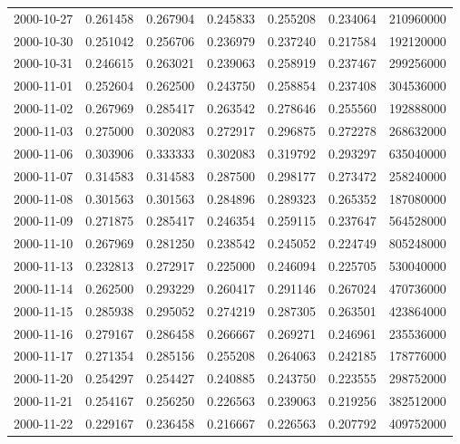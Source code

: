 \begin{tabular}{lrrrrrr}
2000-10-27 &    0.261458 &    0.267904 &    0.245833 &    0.255208 &    0.234064 &   210960000 \\
2000-10-30 &    0.251042 &    0.256706 &    0.236979 &    0.237240 &    0.217584 &   192120000 \\
2000-10-31 &    0.246615 &    0.263021 &    0.239063 &    0.258919 &    0.237467 &   299256000 \\
2000-11-01 &    0.252604 &    0.262500 &    0.243750 &    0.258854 &    0.237408 &   304536000 \\
2000-11-02 &    0.267969 &    0.285417 &    0.263542 &    0.278646 &    0.255560 &   192888000 \\
2000-11-03 &    0.275000 &    0.302083 &    0.272917 &    0.296875 &    0.272278 &   268632000 \\
2000-11-06 &    0.303906 &    0.333333 &    0.302083 &    0.319792 &    0.293297 &   635040000 \\
2000-11-07 &    0.314583 &    0.314583 &    0.287500 &    0.298177 &    0.273472 &   258240000 \\
2000-11-08 &    0.301563 &    0.301563 &    0.284896 &    0.289323 &    0.265352 &   187080000 \\
2000-11-09 &    0.271875 &    0.285417 &    0.246354 &    0.259115 &    0.237647 &   564528000 \\
2000-11-10 &    0.267969 &    0.281250 &    0.238542 &    0.245052 &    0.224749 &   805248000 \\
2000-11-13 &    0.232813 &    0.272917 &    0.225000 &    0.246094 &    0.225705 &   530040000 \\
2000-11-14 &    0.262500 &    0.293229 &    0.260417 &    0.291146 &    0.267024 &   470736000 \\
2000-11-15 &    0.285938 &    0.295052 &    0.274219 &    0.287305 &    0.263501 &   423864000 \\
2000-11-16 &    0.279167 &    0.286458 &    0.266667 &    0.269271 &    0.246961 &   235536000 \\
2000-11-17 &    0.271354 &    0.285156 &    0.255208 &    0.264063 &    0.242185 &   178776000 \\
2000-11-20 &    0.254297 &    0.254427 &    0.240885 &    0.243750 &    0.223555 &   298752000 \\
2000-11-21 &    0.254167 &    0.256250 &    0.226563 &    0.239063 &    0.219256 &   382512000 \\
2000-11-22 &    0.229167 &    0.236458 &    0.216667 &    0.226563 &    0.207792 &   409752000 \\

\end{tabular}
